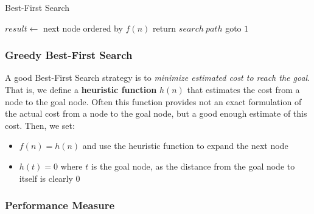 \documentclass[12pt]{article}
\begin{document}
\begin{algorithm}
\caption{Best-First Search}\label{euclid}
\begin{algorithmic}[1]
\State $result \leftarrow$ next node ordered by $f(n)$
	\State return $search\ path$
\Else
	\State goto $1$
\EndIf
\end{algorithmic}
\end{algorithm}

\subsubsection{Greedy Best-First Search}

A good Best-First Search strategy is to \textit{minimize estimated cost to reach the goal}. That is, we define a \textbf{heuristic function} $h(n)$ that estimates the cost from a node to the goal node. Often this function provides not an exact formulation of the actual cost from a node to the goal node, but a good enough estimate of this cost. Then, we set:

\begin{itemize}
\item $f(n) = h(n)$ and use the heuristic function to expand the next node
\item $h(t) = 0$ where $t$ is the goal node, as the distance from the goal node to itself is clearly 0
\end{itemize}

\subsubsection{Performance Measure}
\end{document}
